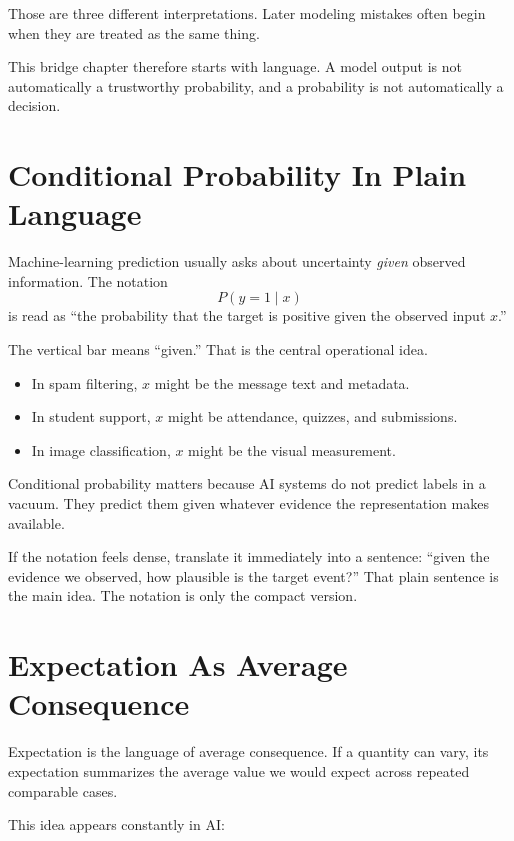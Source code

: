 Those are three different interpretations. Later modeling mistakes often begin when they are treated as the same thing.

This bridge chapter therefore starts with language. A model output is not automatically a trustworthy probability, and a probability is not automatically a decision.

\section*{Conditional Probability In Plain Language}

Machine-learning prediction usually asks about uncertainty \emph{given} observed information. The notation
\[
P(y=1 \mid x)
\]
is read as ``the probability that the target is positive given the observed input \(x\).''

The vertical bar means ``given.'' That is the central operational idea.

\begin{itemize}[leftmargin=*]
\item In spam filtering, \(x\) might be the message text and metadata.
\item In student support, \(x\) might be attendance, quizzes, and submissions.
\item In image classification, \(x\) might be the visual measurement.
\end{itemize}

Conditional probability matters because AI systems do not predict labels in a vacuum. They predict them given whatever evidence the representation makes available.

\begin{prereqbridge}
If the notation feels dense, translate it immediately into a sentence: ``given the evidence we observed, how plausible is the target event?'' That plain sentence is the main idea. The notation is only the compact version.
\end{prereqbridge}

\section*{Expectation As Average Consequence}

Expectation is the language of average consequence. If a quantity can vary, its expectation summarizes the average value we would expect across repeated comparable cases.

This idea appears constantly in AI:

